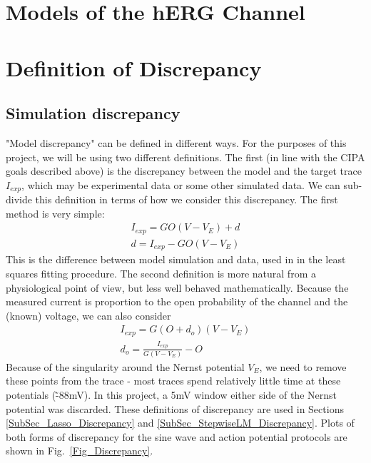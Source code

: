 \documentclass[11pt,a4paper,oneside]{article}
\begin{document}
{\section{Models of the hERG Channel} \label{}


\section{Definition of Discrepancy} \label{ModelsOfDiscrepancy}
\subsection{Simulation discrepancy}
"Model discrepancy" can be defined in different ways. For the purposes of this project, we will be using two different definitions. The first (in line with the CIPA goals described above) is the discrepancy between the model and the target trace $I_{exp}$, which may be experimental data or some other simulated data. We can sub-divide this definition in terms of how we consider this discrepancy. The first method is very simple:
\begin{align}
	I_{exp} = G O ( V - V_E ) + d\\
	d = I_{exp} - G O ( V - V_E )
\end{align}
This is the difference between model simulation and data, used in \cite{Beattie2018} in the least squares fitting procedure. The second definition is more natural from a physiological point of view, but less well behaved mathematically. Because the measured current is proportion to the open probability of the channel and the (known) voltage, we can also consider
\begin{align}
	I_{exp} = G ( O + d_o ) ( V - V_E )\\
	d_o = \frac{I_{exp} }{ G( V - V_E ) } - O
\end{align}
Because of the singularity around the Nernst potential $V_E$, we need to remove these points from the trace - most traces spend relatively little time at these potentials (\~-88mV). In this project, a 5mV window either side of the Nernst potential was discarded. These definitions of discrepancy are used in Sections \ref{SubSec_Lasso_Discrepancy} and \ref{SubSec_StepwiseLM_Discrepancy}. Plots of both forms of discrepancy for the sine wave and action potential protocols are shown in Fig.~\ref{Fig_Discrepancy}.

}
\end{document}

